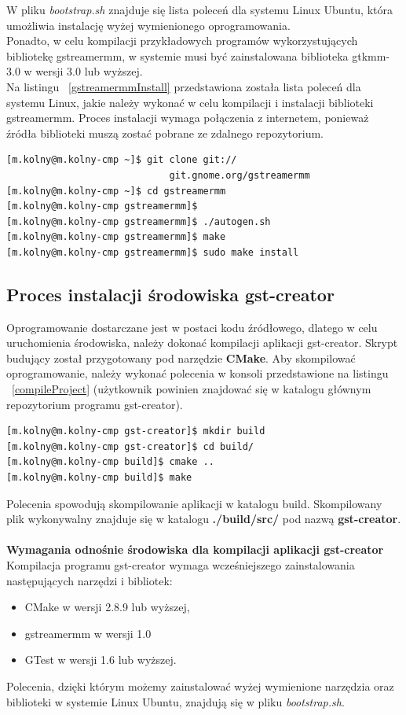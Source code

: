 \documentclass[12pt]{article}
\begin{document}
W pliku \textit{bootstrap.sh} znajduje się lista poleceń dla systemu Linux Ubuntu, która umożliwia instalację wyżej wymienionego oprogramowania.\\
Ponadto, w celu kompilacji przykładowych programów wykorzystujących bibliotekę gstreamermm, w systemie musi być zainstalowana biblioteka gtkmm-3.0 w wersji 3.0 lub wyższej.\\
Na listingu ~\ref{gstreamermmInstall} przedstawiona została lista poleceń dla systemu Linux, jakie należy wykonać w celu kompilacji i instalacji biblioteki gstreamermm. Proces instalacji wymaga połączenia z internetem, ponieważ źródła biblioteki muszą zostać pobrane ze zdalnego repozytorium.
\begin{lstlisting}[caption=Polecenia kompilujące program gst-creator, label=gstreamermmInstall]
[m.kolny@m.kolny-cmp ~]$ git clone git://
                             git.gnome.org/gstreamermm
[m.kolny@m.kolny-cmp ~]$ cd gstreamermm
[m.kolny@m.kolny-cmp gstreamermm]$ 
[m.kolny@m.kolny-cmp gstreamermm]$ ./autogen.sh
[m.kolny@m.kolny-cmp gstreamermm]$ make
[m.kolny@m.kolny-cmp gstreamermm]$ sudo make install
\end{lstlisting}


\subsection{Proces instalacji środowiska gst-creator}
Oprogramowanie dostarczane jest w postaci kodu źródłowego, dlatego w celu uruchomienia środowiska, należy dokonać kompilacji aplikacji gst-creator. Skrypt budujący został przygotowany pod narzędzie \textbf{CMake}. Aby skompilować oprogramowanie, należy wykonać polecenia w konsoli przedstawione na listingu ~\ref{compileProject} (użytkownik powinien znajdować się w katalogu głównym repozytorium programu gst-creator).
\begin{lstlisting}[caption=Polecenia kompilujące program gst-creator, label=compileProject]
[m.kolny@m.kolny-cmp gst-creator]$ mkdir build
[m.kolny@m.kolny-cmp gst-creator]$ cd build/
[m.kolny@m.kolny-cmp build]$ cmake ..
[m.kolny@m.kolny-cmp build]$ make
\end{lstlisting}
Polecenia spowodują skompilowanie aplikacji w katalogu build. Skompilowany plik wykonywalny znajduje się w katalogu \textbf{./build/src/} pod nazwą \textbf{gst-creator}. 
\paragraph{}
\textbf{Wymagania odnośnie środowiska dla kompilacji aplikacji gst-creator} \\
Kompilacja programu gst-creator wymaga wcześniejszego zainstalowania następujących narzędzi i bibliotek:
\begin{itemize}
  \setlength{\itemsep}{0em}
\item CMake w wersji 2.8.9 lub wyższej,
\item gstreamermm w wersji 1.0
\item GTest w wersji 1.6 lub wyższej.
\end{itemize}
Polecenia, dzięki którym możemy zainstalować wyżej wymienione narzędzia oraz biblioteki w systemie Linux Ubuntu, znajdują się w pliku \textit{bootstrap.sh}.
\end{document}
